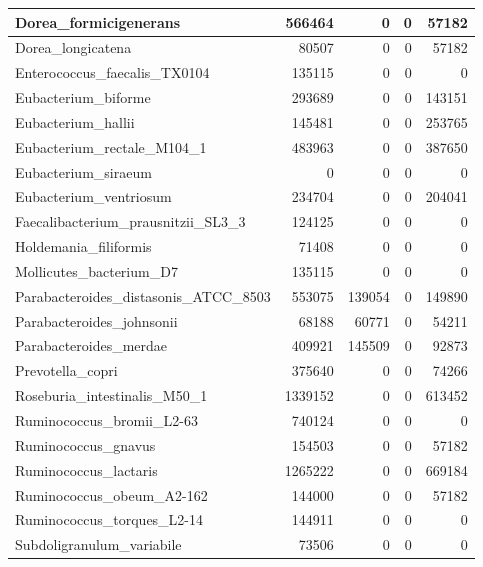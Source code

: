 \documentclass[12pt,a4paper]{article}
\begin{document}
\begin{table}[ht]
\begin{center}
\begin{tabular}{|l*{4}{|r}|}
Dorea\_formicigenerans & 566464 & 0 & 0 & 57182 \\ \hline
Dorea\_longicatena & 80507 & 0 & 0 & 57182 \\ \hline
Enterococcus\_faecalis\_TX0104 & 135115 & 0 & 0 & 0 \\ \hline
Eubacterium\_biforme & 293689 & 0 & 0 & 143151 \\ \hline
Eubacterium\_hallii & 145481 & 0 & 0 & 253765 \\ \hline
Eubacterium\_rectale\_M104\_1 & 483963 & 0 & 0 & 387650 \\ \hline
Eubacterium\_siraeum & 0 & 0 & 0 & 0 \\ \hline
Eubacterium\_ventriosum & 234704 & 0 & 0 & 204041 \\ \hline
Faecalibacterium\_prausnitzii\_SL3\_3 & 124125 & 0 & 0 & 0 \\ \hline
Holdemania\_filiformis & 71408 & 0 & 0 & 0 \\ \hline
Mollicutes\_bacterium\_D7 & 135115 & 0 & 0 & 0 \\ \hline
Parabacteroides\_distasonis\_ATCC\_8503 & 553075 & 139054 & 0 & 149890 \\ \hline
Parabacteroides\_johnsonii & 68188 & 60771 & 0 & 54211 \\ \hline
Parabacteroides\_merdae & 409921 & 145509 & 0 & 92873 \\ \hline
Prevotella\_copri & 375640 & 0 & 0 & 74266 \\ \hline
Roseburia\_intestinalis\_M50\_1 & 1339152 & 0 & 0 & 613452 \\ \hline
Ruminococcus\_bromii\_L2-63 & 740124 & 0 & 0 & 0 \\ \hline
Ruminococcus\_gnavus & 154503 & 0 & 0 & 57182 \\ \hline
Ruminococcus\_lactaris & 1265222 & 0 & 0 & 669184 \\ \hline
Ruminococcus\_obeum\_A2-162 & 144000 & 0 & 0 & 57182 \\ \hline
Ruminococcus\_torques\_L2-14 & 144911 & 0 & 0 & 0 \\ \hline
Subdoligranulum\_variabile & 73506 & 0 & 0 & 0 \\ \hline
\end{tabular}
\end{center}
\end{table}
\end{document}
